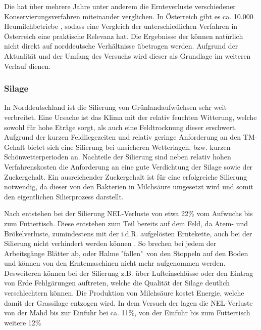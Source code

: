 Die \HBLFA hat über mehrere Jahre unter anderem die Ernteverluste verschiedener Konservierungsverfahren miteinander verglichen.
In Österreich gibt es ca. 10.000 Heumilchbetriebe \parencite[75]{fritz2018ansatz}, sodass eine Vergleich der unterschiedlichen Verfahren in Österreich eine praktische Relevanz hat.
Die Ergebnisse der \HBLFA können natürlich nicht direkt auf norddeutsche Verhältnisse übetragen werden.
Aufgrund der Aktualität und der Umfang des Versuchs wird dieser als Grundlage im weiteren Verlauf dienen.


\subsubsection{Silage}
\label{subsub:Silage}
In Norddeutschland ist die Silierung von Grünlandaufwüchsen sehr weit verbreitet.
Eine Ursache ist das Klima mit der relativ feuchten Witterung, welche sowohl für hohe Eträge sorgt, als auch eine Feldtrocknung dieser erschwert.
Aufgrund der kurzen Feldliegezeiten und relativ geringe Anforderung an den \ac{TM}-Gehalt bietet sich eine Silierung bei unsicheren Wetterlagen, bzw. kurzen Schönwetterperioden an. 
Nachteile der Silierung sind neben relativ hohen Verfahrenskosten die Anforderung an eine gute Verdichtung der Silage sowie der Zuckergehalt.
Ein ausreichender Zuckergehalt ist für eine erfolgreiche Silierung notwendig, da dieser von den Bakterien in Milchsäure umgesetzt wird und somit den eigentlichen Silierprozess darstellt. 

Nach \textcite[30]{fritz2018wirtschaftliche} entstehen bei der Silierung \ac{NEL}-Verluste von etwa 22\% vom Aufwuchs bis zum Futtertisch.
Diese entstehen zum Teil bereits auf dem Feld, da Atem- und Brökelverluste, zumindestens mit der i.d.R. aufgelösten Erntekette, auch bei der Silierung nicht verhindert werden können \parencite[58f]{gruber2015einfluss}.
So brechen bei jedem der Arbeitsgänge Blätter ab, oder Halme "fallen"\ von den Stoppeln auf den Boden und können von den Erntemaschinen nicht mehr aufgenommen werden.
Desweiteren können bei der Silierung z.B. über Lufteinschlüsse oder den Eintrag von Erde Fehlgärungen auftreten, welche die Qualität der Silage deutlich verschlechtern können.
Die Produktion von Milchsäure kostet Energie, welche damit der Grassilage entzogen wird\parencite[61]{gruber2015einfluss}.
In dem Versuch der \HBLFA lagen die \ac{NEL}-Verluste von der Mahd bis zur Einfuhr bei ca. 11\%, von der Einfuhr bis zum Futtertisch weitere 12\% \parencite[30]{fritz2018wirtschaftliche}


